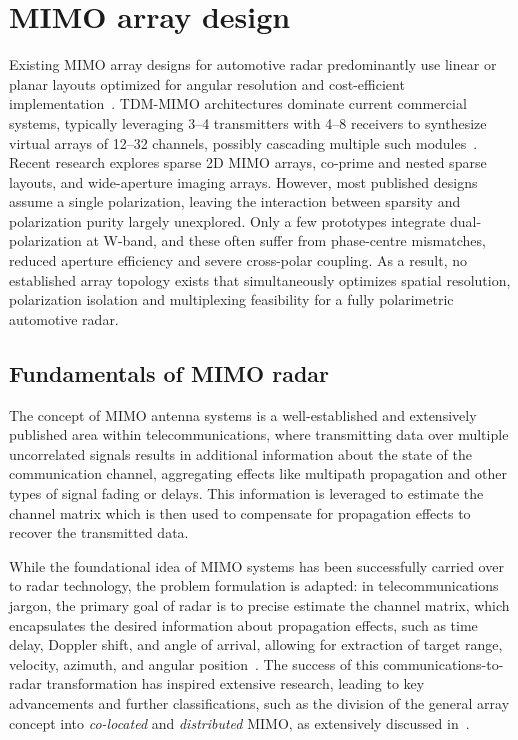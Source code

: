 \chapter{MIMO array design}
\label{chap:mimo-topologies}

Existing MIMO array designs for automotive radar predominantly use linear or planar layouts optimized for angular resolution and cost-efficient implementation~\parencite{texasInstrumentsAwr2994EvaluationModule2024}.
TDM-MIMO architectures dominate current commercial systems, typically leveraging 3--4 transmitters with 4--8 receivers to synthesize virtual arrays of 12--32 channels, possibly cascading multiple such modules~\parencite{texasInstrumentsAwrxCascadedRadar2020}.
Recent research explores sparse 2D MIMO arrays, co-prime and nested sparse layouts, and wide-aperture imaging arrays.
However, most published designs assume a single polarization, leaving the interaction between sparsity and polarization purity largely unexplored.
Only a few prototypes integrate dual-polarization at W-band, and these often suffer from phase-centre mismatches, reduced aperture efficiency and severe cross-polar coupling.
As a result, no established array topology exists that simultaneously optimizes spatial resolution, polarization isolation and multiplexing feasibility for a fully polarimetric automotive radar.


\section{Fundamentals of MIMO radar}

The concept of MIMO antenna systems is a well-established and extensively published area within telecommunications, where transmitting data over multiple uncorrelated signals results in additional information about the state of the communication channel, aggregating effects like multipath propagation and other types of signal fading or delays.
This information is leveraged to estimate the channel matrix which is then used to compensate for propagation effects to recover the transmitted data.

While the foundational idea of MIMO systems has been successfully carried over to radar technology, the problem formulation is adapted: in telecommunications jargon, the primary goal of radar is to precise estimate the channel matrix, which encapsulates the desired information about propagation effects, such as time delay, Doppler shift, and angle of arrival, allowing for extraction of target range, velocity, azimuth, and angular position~\parencite{blissMultipleinputMultipleoutputMIMO2003,forsytheMultipleinputMultipleoutputMIMO2004}.
The success of this communications-to-radar transformation has inspired extensive research, leading to key advancements and further classifications, such as the division of the general array concept into \emph{co-located} and \emph{distributed} MIMO, as extensively discussed in~\parencite{fishlerMIMORadarIdea2004,fishlerSpatialDiversityRadars2006}.

